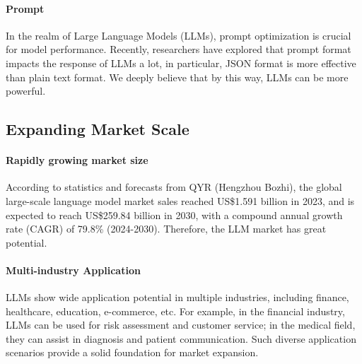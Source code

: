 \documentclass[fleqn,10pt]{SelfArx} %
\begin{document}
\paragraph{Prompt} In the realm of Large Language Models (LLMs), prompt optimization is crucial for model performance.\cite{he2024doespromptformattingimpact} Recently, researchers have explored that prompt format impacts the response of LLMs a lot, in particular, JSON format is more effective than plain text format.\cite{he2024doespromptformattingimpact} We deeply believe that by this way, LLMs can be more powerful.
\subsection{Expanding Market Scale}

\paragraph{Rapidly growing market size} According to statistics and forecasts from QYR (Hengzhou Bozhi), the global large-scale language model market sales reached US\$1.591 billion in 2023, and is expected to reach US\$259.84 billion in 2030, with a compound annual growth rate (CAGR) of 79.8\% (2024-2030).\cite{website-llm-market} Therefore, the LLM market has great potential.

\paragraph{Multi-industry Application} LLMs show wide application potential in multiple industries, including finance, healthcare, education, e-commerce, etc. For example, in the financial industry, LLMs can be used for risk assessment and customer service; in the medical field, they can assist in diagnosis and patient communication. Such diverse application scenarios provide a solid foundation for market expansion.\cite{website-llm-mulins}
\end{document}
